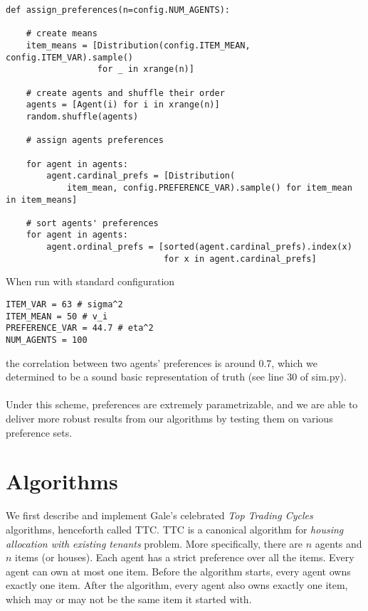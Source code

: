 \documentclass[12pt]{article}
\begin{document}
\begin{verbatim}
def assign_preferences(n=config.NUM_AGENTS):

    # create means
    item_means = [Distribution(config.ITEM_MEAN, config.ITEM_VAR).sample()
                  for _ in xrange(n)]

    # create agents and shuffle their order
    agents = [Agent(i) for i in xrange(n)]
    random.shuffle(agents)

    # assign agents preferences

    for agent in agents:
        agent.cardinal_prefs = [Distribution(
            item_mean, config.PREFERENCE_VAR).sample() for item_mean in item_means]

    # sort agents' preferences
    for agent in agents:
        agent.ordinal_prefs = [sorted(agent.cardinal_prefs).index(x)
                               for x in agent.cardinal_prefs]
\end{verbatim}

\noindent When run with standard configuration
\begin{verbatim}
ITEM_VAR = 63 # sigma^2
ITEM_MEAN = 50 # v_i
PREFERENCE_VAR = 44.7 # eta^2
NUM_AGENTS = 100
\end{verbatim}
\noindent the correlation between two agents' preferences is around 0.7, which we determined to be a sound basic representation of truth (see line 30 of sim.py).
\\\\Under this scheme, preferences are extremely parametrizable, and we are able to deliver more robust results from our algorithms by testing them on various preference sets.

\section*{Algorithms}

We first describe and implement Gale's celebrated \textit{Top Trading Cycles} algorithms, henceforth called TTC. TTC is a canonical algorithm for \textit{housing allocation with existing tenants} problem. More specifically, there are $n$ agents and $n$ items (or houses). Each agent has a strict preference over all the items. Every agent can own at most one item. Before the algorithm starts, every agent owns exactly one item. After the algorithm, every agent also owns exactly one item, which may or may not be the same item it started with. 
\end{document}
